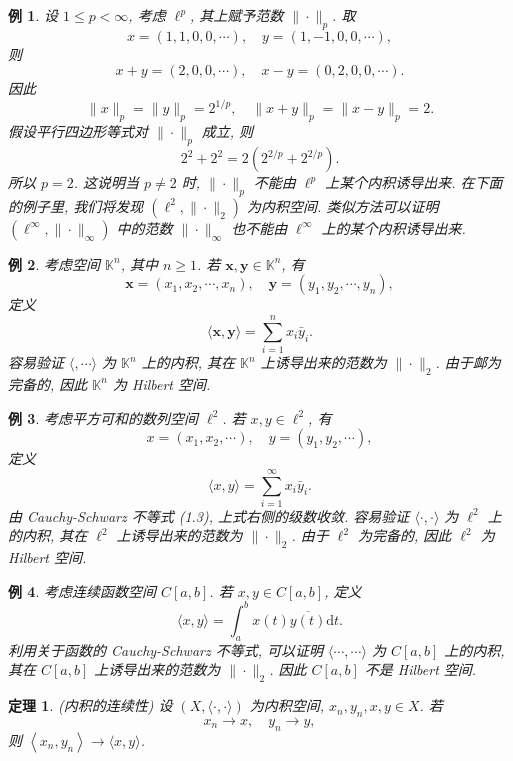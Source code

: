 \documentclass[openany]{ctexbook}
\theoremstyle{kaiti}
\newtheorem{theorem}{定理}[section]
\theoremstyle{normal}
\newtheorem{example}{例}[section]
\begin{document}
\begin{example}
设 $1 \leqslant p<\infty$, 考虑 $\ell^{p}$, 其上赋予范数 $\|\cdot\|_{p}$. 取
$$
x=(1,1,0,0, \cdots), \quad y=(1,-1,0,0, \cdots),
$$
则
$$
x+y=(2,0,0, \cdots), \quad x-y=(0,2,0,0, \cdots).
$$
因此
$$
\|x\|_{p}=\|y\|_{p}=2^{1 / p}, \quad\|x+y\|_{p}=\|x-y\|_{p}=2.
$$
假设平行四边形等式对 $\|\cdot\|_{p}$ 成立, 则
$$
2^2+2^2=2\left(2^{2 / p}+2^{2 / p}\right).
$$
所以 $p=2$. 这说明当 $p \neq 2$ 时, $\|\cdot\|_{p}$ 不能由 $\ell^{p}$ 上某个内积诱导出来. 在下面的例子里, 我们将发现 $\left(\ell^2,\|\cdot\|_2\right)$ 为内积空间. 类似方法可以证明 $\left(\ell^{\infty},\|\cdot\|_{\infty}\right)$ 中的范数 $\|\cdot\|_{\infty}$ 也不能由 $\ell^{\infty}$ 上的某个内积诱导出来.
\end{example}

\begin{example}
考虑空间 $\mathbb{K}^n$, 其中 $n \geqslant 1$. 若 $\boldsymbol{x}, \boldsymbol{y} \in \mathbb{K}^n$, 有
$$
\boldsymbol{x}=\left(x_1, x_2, \cdots, x_n\right), \quad \boldsymbol{y}=\left(y_1, y_2, \cdots, y_n\right),
$$
定义
$$
\langle\boldsymbol{x}, \boldsymbol{y}\rangle=\sum_{i=1}^n x_{i} \bar{y}_{i}.
$$
容易验证 $\langle, \cdots\rangle$ 为 $\mathbb{K}^n$ 上的内积, 其在 $\mathbb{K}^n$ 上诱导出来的范数为 $\|\cdot\|_2$. 由于䘏为完备的, 因此 $\mathbb{K}^n$ 为 Hilbert 空间.
\end{example}

\begin{example}
考虑平方可和的数列空间 $\ell^2$. 若 $x, y \in \ell^2$, 有
$$
x=\left(x_1, x_2, \cdots\right), \quad y=\left(y_1, y_2, \cdots\right),
$$
定义
$$
\langle x, y\rangle=\sum_{i=1}^{\infty} x_{i} \bar{y}_{i}.
$$
由 Cauchy-Schwarz 不等式 (1.3), 上式右侧的级数收敛. 容易验证 $\langle\cdot, \cdot\rangle$ 为 $\ell^2$ 上的内积, 其在 $\ell^2$ 上诱导出来的范数为 $\|\cdot\|_2$. 由于 $\ell^2$ 为完备的, 因此 $\ell^2$ 为 Hilbert 空间.
\end{example}

\begin{example}
考虑连续函数空间 $C[a, b]$. 若 $x, y \in C[a, b]$, 定义
$$
\langle x, y\rangle=\int_{a}^{b} x(t) \overline{y(t)} \mathrm{d} t.
$$
利用关于函数的 Cauchy-Schwarz 不等式, 可以证明 $\langle\cdots, \cdots\rangle$ 为 $C[a, b]$ 上的内积, 其在 $C[a, b]$ 上诱导出来的范数为 $\|\cdot\|_2$. 因此 $C[a, b]$ 不是 Hilbert 空间.
\end{example}

\begin{theorem}
(内积的连续性) 设 $(X,\langle\cdot, \cdot\rangle)$ 为内积空间, $x_n, y_n, x, y \in X$. 若
$$
x_n \rightarrow x, \quad y_n \rightarrow y,
$$
则 $\left\langle x_n, y_n\right\rangle \rightarrow\langle x, y\rangle$.
\end{theorem}
\end{document}
